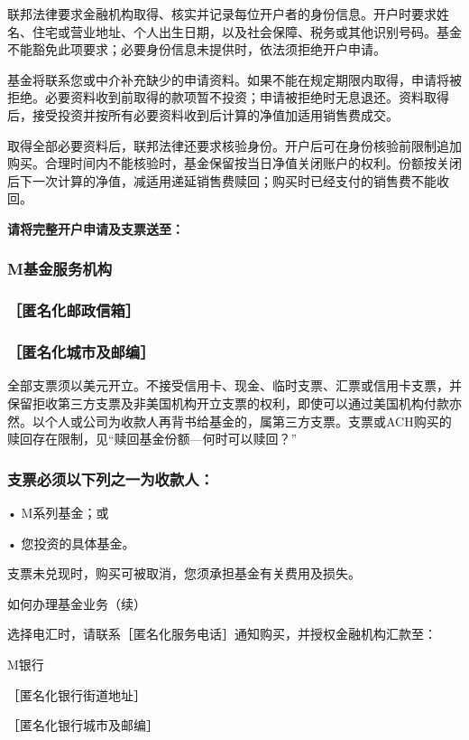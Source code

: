 \documentclass[UTF8,fontset=none,11pt,a4paper]{ctexart}
\begin{document}
联邦法律要求金融机构取得、核实并记录每位开户者的身份信息。开户时要求姓名、住宅或营业地址、个人出生日期，以及社会保障、税务或其他识别号码。基金不能豁免此项要求；必要身份信息未提供时，依法须拒绝开户申请。

基金将联系您或中介补充缺少的申请资料。如果不能在规定期限内取得，申请将被拒绝。必要资料收到前取得的款项暂不投资；申请被拒绝时无息退还。资料取得后，接受投资并按所有必要资料收到后计算的净值加适用销售费成交。

取得全部必要资料后，联邦法律还要求核验身份。开户后可在身份核验前限制追加购买。合理时间内不能核验时，基金保留按当日净值关闭账户的权利。份额按关闭后下一次计算的净值，减适用递延销售费赎回；购买时已经支付的销售费不能收回。

\textbf{请将完整开户申请及支票送至：}

\subsubsection*{M基金服务机构}
\subsubsection*{［匿名化邮政信箱］}
\subsubsection*{［匿名化城市及邮编］}
全部支票须以美元开立。不接受信用卡、现金、临时支票、汇票或信用卡支票，并保留拒收第三方支票及非美国机构开立支票的权利，即使可以通过美国机构付款亦然。以个人或公司为收款人再背书给基金的，属第三方支票。支票或ACH购买的赎回存在限制，见“赎回基金份额—何时可以赎回？”

\subsubsection*{支票必须以下列之一为收款人：}
\noindent • M系列基金；或\par\smallskip
\noindent • 您投资的具体基金。\par\smallskip
支票未兑现时，购买可被取消，您须承担基金有关费用及损失。


\par{}\label{originalpage12}
如何办理基金业务（续）

选择电汇时，请联系［匿名化服务电话］通知购买，并授权金融机构汇款至：

M银行

［匿名化银行街道地址］

［匿名化银行城市及邮编］
\end{document}
